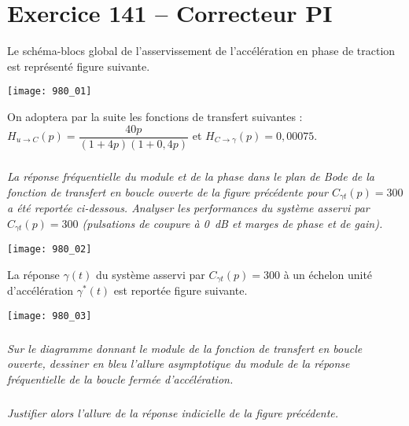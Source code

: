 \section*{Exercice 141 -- Correcteur PI}
\setcounter{exo}{0}


Le schéma-blocs global de l’asservissement de l’accélération en phase de traction est représenté figure suivante. 


\begin{center}
\texttt{[image: 980\_01]}%
\end{center}

On adoptera par la suite les fonctions de transfert suivantes : $H_{u\rightarrow C}(p)=\dfrac{40p}{\left( 1+4p\right)\left(1+0,4 p \right)}$ et $H_{C\rightarrow \gamma}(p)=0,00075$.

\subparagraph{}
\textit{La réponse fréquentielle du module et de la phase dans le plan de Bode de la fonction de
transfert en boucle ouverte de la figure précédente pour $C_{\gamma t} ( p) = 300 $  a été reportée ci-dessous.
Analyser les performances du système asservi par $C_{\gamma t} (p) = 300 $ (pulsations de coupure
à \SI{0}{dB} et marges de phase et de gain).}
\ifprof
\begin{corrige}
\end{corrige}
\else
\fi

\begin{center}
\texttt{[image: 980\_02]}%
\end{center}

La réponse $\gamma(t)$ du système asservi par $C_{\gamma t} ( p) = 300$ à un échelon unité d’accélération $\gamma^* (t)$ est reportée figure suivante.

\begin{center}
\texttt{[image: 980\_03]}%
\end{center}

\subparagraph{}
\textit{Sur le diagramme donnant le module de la fonction de transfert en boucle
ouverte, dessiner en bleu l’allure asymptotique du module de la réponse fréquentielle de la boucle
fermée d’accélération.}
\ifprof
\begin{corrige}
\end{corrige}
\else
\fi

\subparagraph{}
\textit{Justifier alors l’allure de la réponse indicielle de la figure précédente.}
\ifprof
\begin{corrige}
\end{corrige}
\else
\fi


